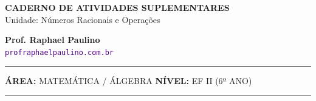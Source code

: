 \documentclass[twoside, 10pt, a4paper]{article}
\begin{document}
\thispagestyle{empty}
\color{Cinzablack}
\vspace*{-1.8cm}

\noindent
\begin{minipage}{\textwidth}
    \selectfont
    
    \noindent
    \begin{minipage}[t]{0.70\linewidth}
        {\Large \bfseries \MakeUppercase{Caderno de Atividades Suplementares}}\\[0.1cm]
        {\large \textmd{\textcolor{CinzaEscuro}{Unidade: Números Racionais e Operações}}}
    \end{minipage}%
    \begin{minipage}[t]{0.30\linewidth}
        \raggedleft
        \small \textbf{Prof. Raphael Paulino}\\
        \textsf{\small \textcolor{indigo}{\texttt{profraphaelpaulino.com.br}}}
    \end{minipage}
    
    \vspace{0.15cm}
    
    \noindent\rule{\linewidth}{1.2pt}
    \vspace{-0.1cm}
    \footnotesize\textsf{\textbf{ÁREA:} MATEMÁTICA / ÁLGEBRA \hfill \textbf{NÍVEL:} EF II (6º ANO)}
    \vspace{0.1cm}
    \noindent\rule{\linewidth}{0.4pt}
\end{minipage}

\par\vspace{0.3cm} 
\end{document}
